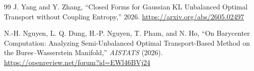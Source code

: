 \documentclass[11pt]{article}
\theoremstyle{definition}
\begin{document}
\begin{thebibliography}{99}
J. Yang and Y. Zhang,
``Closed Forms for Gaussian KL Unbalanced Optimal Transport without Coupling
Entropy,'' 2026.
\url{https://arxiv.org/abs/2605.02497}

N.-H. Nguyen, L. Q. Dung, H.-P. Nguyen, T. Pham, and N. Ho,
``On Barycenter Computation: Analyzing Semi-Unbalanced Optimal
Transport-Based Method on the Bures--Wasserstein Manifold,''
\emph{AISTATS} (2026).
\url{https://openreview.net/forum?id=EWl46BVj24}

\end{thebibliography}
\end{document}
